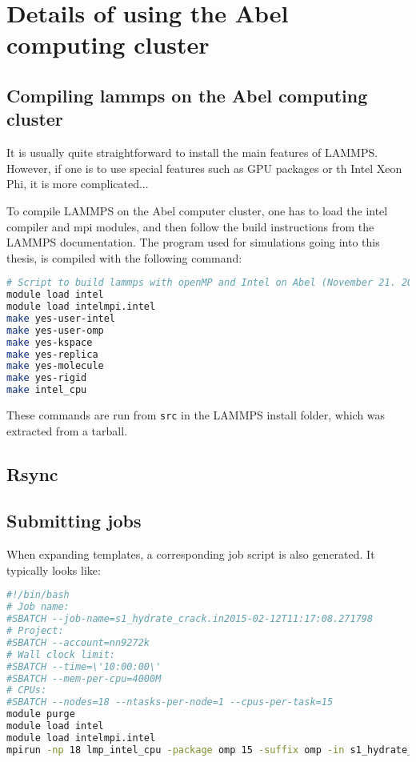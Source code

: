 \chapter{Details of using the Abel computing cluster}

\section{Compiling lammps on the Abel computing cluster}
It is usually quite straightforward to install the main features of LAMMPS. However, if one is to use special features such as GPU packages or th Intel Xeon Phi, it is more complicated... 	

To compile LAMMPS on the Abel computer cluster, one has to load the intel compiler and mpi modules, and then follow the build instructions from the LAMMPS documentation. The program used for simulations going into this thesis, is compiled with the following command:
\begin{lstlisting}[language=Bash]
# Script to build lammps with openMP and Intel on Abel (November 21. 2014)
module load intel
module load intelmpi.intel
make yes-user-intel
make yes-user-omp
make yes-kspace
make yes-replica
make yes-molecule
make yes-rigid
make intel_cpu
\end{lstlisting}
These commands are run from {\tt src} in the LAMMPS install folder, which was extracted from a tarball.

\section{Rsync}

\section{Submitting jobs}
When expanding templates, a corresponding job script is also generated. It typically looks like:
\begin{lstlisting}[language=Bash]
#!/bin/bash
# Job name:
#SBATCH --job-name=s1_hydrate_crack.in2015-02-12T11:17:08.271798
# Project: 
#SBATCH --account=nn9272k
# Wall clock limit:
#SBATCH --time=\'10:00:00\'
#SBATCH --mem-per-cpu=4000M
# CPUs:
#SBATCH --nodes=18 --ntasks-per-node=1 --cpus-per-task=15
module purge
module load intel
module load intelmpi.intel
mpirun -np 18 lmp_intel_cpu -package omp 15 -suffix omp -in s1_hydrate_crack.in
\end{lstlisting}